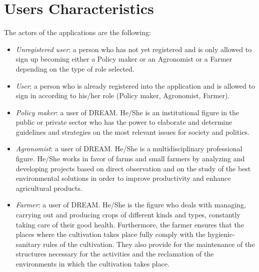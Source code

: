 \section{Users Characteristics}
The actors of the applications are the following:
\begin{itemize}
    \item \textit {Unregistered user}: a person who has not yet registered and is only allowed to sign up becoming either a Policy maker or an Agronomist or a Farmer depending on the type of role selected.
    \item \textit {User}: a person who is already registered into the application and is allowed to sign in according to his/her role (Policy maker, Agronomist, Farmer).
    \item \textit {Policy maker}: a user of DREAM. He/She is an institutional figure in the public or private sector who has the power to elaborate and determine guidelines and strategies on the most relevant issues for society and politics. 
    \item \textit {Agronomist}: a user of DREAM. He/She is a multidisciplinary professional figure. He/She works in favor of farms and small farmers by analyzing and developing projects based on direct observation and on the study of the best environmental solutions in order to improve productivity and enhance agricultural products.
    \item \textit {Farmer}: a user of DREAM. He/She is the figure who deals with managing, carrying out and producing crops of different kinds and types, constantly taking care of their good health. Furthermore, the farmer ensures that the places where the cultivation takes place fully comply with the hygienic-sanitary rules of the cultivation. They also provide for the maintenance of the structures necessary for the activities and the reclamation of the environments in which the cultivation takes place.

\end{itemize}